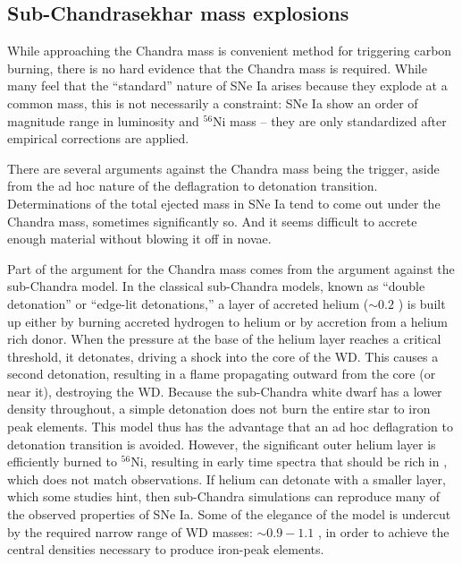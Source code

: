 \documentclass{nature1}
\begin{document}
\subsection{Sub-Chandrasekhar mass explosions}
While approaching the Chandra mass is convenient method for triggering
carbon burning, there is no hard evidence that the Chandra mass is
required.  While many feel that the ``standard'' nature of SNe Ia
arises because they explode at a common mass, this is not necessarily
a constraint: SNe Ia show an order of magnitude range in luminosity
and $^{56}$Ni mass -- they are only standardized after empirical
corrections are applied\citep{1996AJ....112.2391H}.

There are several arguments against the Chandra mass being the
trigger, aside from the ad hoc nature of the deflagration to detonation
transition.  Determinations of the total ejected mass in SNe Ia tend
to come out under the Chandra mass, sometimes significantly
so\citep{2006A&A...460..793S}.  And it seems difficult to accrete
enough material without blowing it off in
novae\citep{1982ApJ...253..798N}.

Part of the argument for the Chandra mass comes from the argument
against the sub-Chandra model.  In the classical sub-Chandra
models\citep{1986ARA&A..24..205W}, known as ``double detonation'' or
``edge-lit detonations,'' a layer of accreted helium ($\sim 0.2$\Msun
) is built up either by burning accreted hydrogen to helium or by
accretion from a helium rich donor.  When the pressure at the base of
the helium layer reaches a critical threshold, it detonates, driving a
shock into the core of the WD.  This causes a second detonation,
resulting in a flame propagating outward from the core (or near it),
destroying the WD.  Because the sub-Chandra white dwarf has a lower
density throughout, a simple detonation does not burn the entire star
to iron peak elements.  This model thus has the advantage that an ad
hoc deflagration to detonation transition is avoided.  However, the
significant outer helium layer is efficiently burned to $^{56}$Ni,
resulting in early time spectra that should be rich in \Ni , which
does not match observations\citep{1997ApJ...485..812N}.  If helium can
detonate with a smaller layer, which some studies
hint\citep{2010ApJ...715..767S}, then sub-Chandra simulations can
reproduce many of the observed properties of SNe
Ia\citep{2010ApJ...714L..52S}.  Some of the elegance of the model is
undercut by the required narrow range of WD masses: $\sim 0.9-1.1$
\Msun , in order to achieve the central densities necessary to produce
iron-peak elements.
\end{document}

